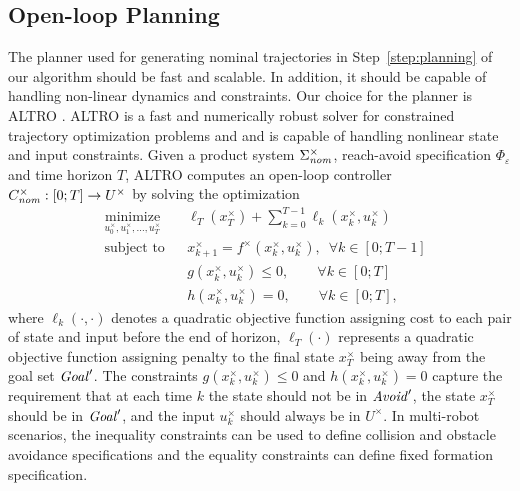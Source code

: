 

\subsection{Open-loop Planning}
The planner used for generating nominal trajectories in Step~\ref{step:planning} of our algorithm should be fast and scalable. In addition, it should be capable of handling non-linear dynamics and constraints. Our choice for the planner is ALTRO \cite{howell2019altro}. ALTRO is a fast and numerically robust solver for constrained trajectory optimization problems and and is capable of handling nonlinear state and input constraints. Given a product system $\Sigma_{\mathit{nom}}^\times$, reach-avoid specification $\Phi_\varepsilon$ and time horizon $T$, ALTRO computes an open-loop controller $C^\times_{\mathit{nom}}:[0;T]\rightarrow U^\times$ by solving the optimization
\begin{equation*}
	\begin{aligned}
		& \underset{u^\times_0,u^\times_1,\ldots,u^\times_T}{\text{minimize}}
		& & \ell_T(x^\times_T)+\sum_{k=0}^{T-1}\ell_k(x^\times_k,u^\times_k) \\
		& \text{subject to}
		& & x^\times_{k+1}=f^\times(x^\times_k,u^\times_k),\,\,\,\forall k\in[0;T-1]\\
		& & &  g(x^\times_k,u^\times_k)\leq 0, \qquad\forall k\in[0;T]\\
		& & &  h(x^\times_k,u^\times_k)=0,\qquad\forall k\in[0;T],
	\end{aligned}
\end{equation*}
where $\ell_k(\cdot,\cdot)$ denotes a quadratic objective function assigning cost to each pair of state and input before the end of horizon, $\ell_T(\cdot)$ represents a quadratic objective function assigning penalty to the final state $x^\times_T$ being away from the goal set $\mathit{Goal}'$. The constraints $g(x^\times_k,u^\times_k)\leq 0$ and $h(x^\times_k,u^\times_k)=0$ capture the requirement that at each time $k$ the state should not be in $\mathit{Avoid}'$, the state $x^\times_T$ should be in $\mathit{Goal}'$, and the input $u^\times_k$ should always be in $U^\times$.
%
In multi-robot scenarios, the inequality constraints can be used to define collision and obstacle avoidance specifications and the equality constraints can define fixed formation specification. 

